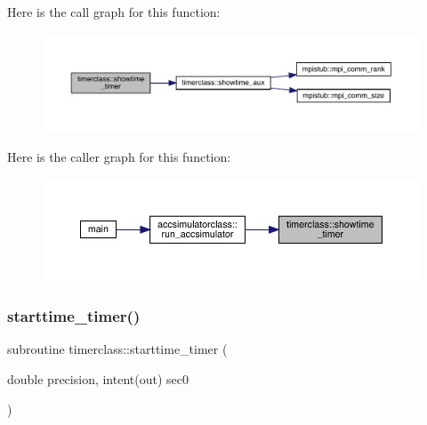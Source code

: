 Here is the call graph for this function\+:\nopagebreak
\begin{figure}[H]
\begin{center}
\leavevmode
\includegraphics[width=350pt]{namespacetimerclass_aa34d67fa57ad546ab7e1a7fb1643e9b0_cgraph}
\end{center}
\end{figure}
Here is the caller graph for this function\+:\nopagebreak
\begin{figure}[H]
\begin{center}
\leavevmode
\includegraphics[width=350pt]{namespacetimerclass_aa34d67fa57ad546ab7e1a7fb1643e9b0_icgraph}
\end{center}
\end{figure}
\mbox{\label{namespacetimerclass_afb272bcdcff72d225c2df5862630025c}} 
\subsubsection{\texorpdfstring{starttime\_timer()}{starttime\_timer()}}
{\footnotesize\ttfamily subroutine timerclass\+::starttime\+\_\+timer (\begin{DoxyParamCaption}\item[{double precision, intent(out)}]{sec0 }\end{DoxyParamCaption})}


